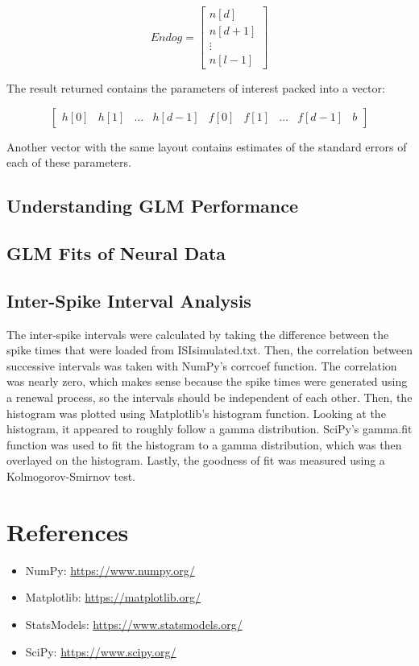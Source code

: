 \documentclass[letterpaper,titlepage,10pt]{article}
\begin{document}
$$Endog=
\begin{bmatrix}
n[d] \\
n[d+1] \\
\vdots \\
n[l-1]
\end{bmatrix}$$

The result returned contains the parameters of interest packed into a vector:

$$\begin{bmatrix}
h[0] & h[1] & \hdots & h[d-1] & f[0] & f[1] & \hdots & f[d-1] & b
\end{bmatrix}$$

Another vector with the same layout contains estimates of the standard errors of each of these parameters.

\subsection{Understanding GLM Performance}

\subsection{GLM Fits of Neural Data}

\subsection{Inter-Spike Interval Analysis}

The inter-spike intervals were calculated by taking the difference between the spike times that were loaded from
ISIsimulated.txt. Then, the correlation between successive intervals was taken with NumPy's corrcoef function.
The correlation was nearly zero, which makes sense because the spike times were generated using a renewal process,
so the intervals should be independent of each other. Then, the histogram was plotted using Matplotlib's histogram
function. Looking at the histogram, it appeared to roughly follow a gamma distribution. SciPy's gamma.fit function
was used to fit the histogram to a gamma distribution, which was then overlayed on the histogram. Lastly, the
goodness of fit was measured using a Kolmogorov-Smirnov test.

\section{References}

\begin{itemize}
\item NumPy: \url{https://www.numpy.org/}
\item Matplotlib: \url{https://matplotlib.org/}
\item StatsModels: \url{https://www.statsmodels.org/}
\item SciPy: \url{https://www.scipy.org/}
\end{itemize}
\end{document}

